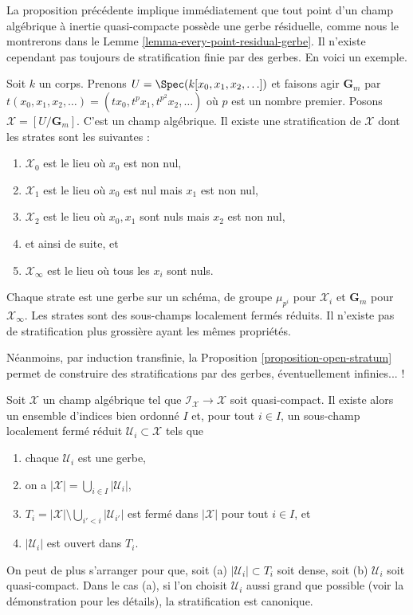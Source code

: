 \noindent
La proposition précédente implique immédiatement que tout point d'un champ
algébrique à inertie quasi-compacte possède une gerbe résiduelle, comme nous
le montrerons dans le Lemme \ref{lemma-every-point-residual-gerbe}.
Il n'existe cependant pas toujours de stratification finie par des gerbes.
En voici un exemple.

\begin{example}
\label{example-infinite-stratification}
Soit $k$ un corps. Prenons $U = \Spec(k[x_0, x_1, x_2, \ldots])$ et faisons
agir $\mathbf{G}_m$ par
$t(x_0, x_1, x_2, \ldots) = (tx_0, t^p x_1, t^{p^2} x_2, \ldots)$
où $p$ est un nombre premier. Posons
$\mathcal{X} = [U/\mathbf{G}_m]$. C'est un champ algébrique. Il existe une
stratification de $\mathcal{X}$ dont les strates sont les suivantes :
\begin{enumerate}
\item $\mathcal{X}_0$ est le lieu où $x_0$ est non nul,
\item $\mathcal{X}_1$ est le lieu où $x_0$ est nul mais $x_1$ est non nul,
\item $\mathcal{X}_2$ est le lieu où $x_0, x_1$ sont nuls mais $x_2$ est non
nul,
\item et ainsi de suite, et
\item $\mathcal{X}_{\infty}$ est le lieu où tous les $x_i$ sont nuls.
\end{enumerate}
Chaque strate est une gerbe sur un schéma, de groupe $\mu_{p^i}$ pour
$\mathcal{X}_i$ et $\mathbf{G}_m$ pour $\mathcal{X}_{\infty}$.
Les strates sont des sous-champs localement fermés réduits. Il n'existe pas
de stratification plus grossière ayant les mêmes propriétés.
\end{example}

\noindent
Néanmoins, par induction transfinie, la
Proposition \ref{proposition-open-stratum} permet de construire des
stratifications par des gerbes, éventuellement infinies... !

\begin{lemma}
\label{lemma-every-point-in-a-stratum}
Soit $\mathcal{X}$ un champ algébrique tel que
$\mathcal{I}_\mathcal{X} \to \mathcal{X}$ soit quasi-compact.
Il existe alors un ensemble d'indices bien ordonné $I$ et, pour tout
$i \in I$, un sous-champ localement fermé réduit
$\mathcal{U}_i \subset \mathcal{X}$ tels que
\begin{enumerate}
\item chaque $\mathcal{U}_i$ est une gerbe,
\item on a $|\mathcal{X}| = \bigcup_{i \in I} |\mathcal{U}_i|$,
\item $T_i = |\mathcal{X}| \setminus \bigcup_{i' < i} |\mathcal{U}_{i'}|$
est fermé dans $|\mathcal{X}|$ pour tout $i \in I$, et
\item $|\mathcal{U}_i|$ est ouvert dans $T_i$.
\end{enumerate}
On peut de plus s'arranger pour que, soit (a)
$|\mathcal{U}_i| \subset T_i$ soit dense, soit (b) $\mathcal{U}_i$ soit
quasi-compact. Dans le cas (a), si l'on choisit $\mathcal{U}_i$ aussi grand
que possible (voir la démonstration pour les détails), la stratification est
canonique.
\end{lemma}

